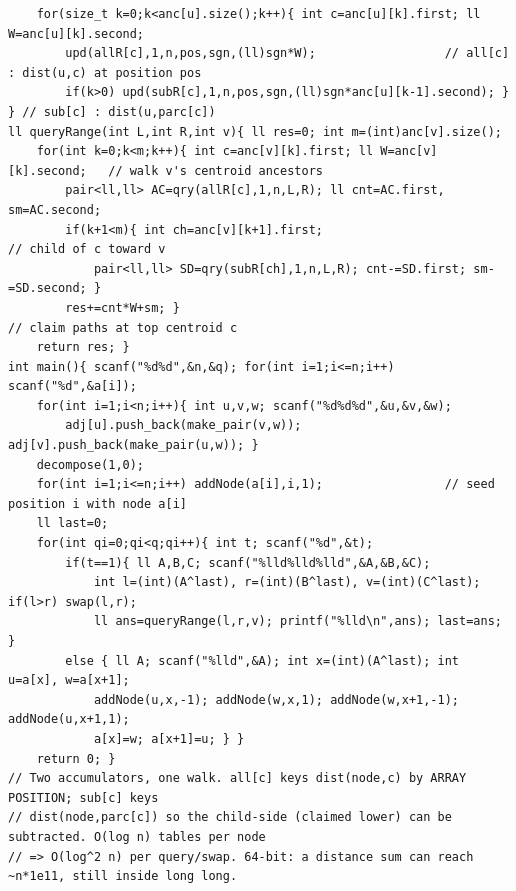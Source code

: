 \begin{lstlisting}
    for(size_t k=0;k<anc[u].size();k++){ int c=anc[u][k].first; ll W=anc[u][k].second;
        upd(allR[c],1,n,pos,sgn,(ll)sgn*W);                  // all[c] : dist(u,c) at position pos
        if(k>0) upd(subR[c],1,n,pos,sgn,(ll)sgn*anc[u][k-1].second); } } // sub[c] : dist(u,parc[c])
ll queryRange(int L,int R,int v){ ll res=0; int m=(int)anc[v].size();
    for(int k=0;k<m;k++){ int c=anc[v][k].first; ll W=anc[v][k].second;   // walk v's centroid ancestors
        pair<ll,ll> AC=qry(allR[c],1,n,L,R); ll cnt=AC.first, sm=AC.second;
        if(k+1<m){ int ch=anc[v][k+1].first;                          // child of c toward v
            pair<ll,ll> SD=qry(subR[ch],1,n,L,R); cnt-=SD.first; sm-=SD.second; }
        res+=cnt*W+sm; }                                              // claim paths at top centroid c
    return res; }
int main(){ scanf("%d%d",&n,&q); for(int i=1;i<=n;i++) scanf("%d",&a[i]);
    for(int i=1;i<n;i++){ int u,v,w; scanf("%d%d%d",&u,&v,&w);
        adj[u].push_back(make_pair(v,w)); adj[v].push_back(make_pair(u,w)); }
    decompose(1,0);
    for(int i=1;i<=n;i++) addNode(a[i],i,1);                 // seed position i with node a[i]
    ll last=0;
    for(int qi=0;qi<q;qi++){ int t; scanf("%d",&t);
        if(t==1){ ll A,B,C; scanf("%lld%lld%lld",&A,&B,&C);
            int l=(int)(A^last), r=(int)(B^last), v=(int)(C^last); if(l>r) swap(l,r);
            ll ans=queryRange(l,r,v); printf("%lld\n",ans); last=ans; }
        else { ll A; scanf("%lld",&A); int x=(int)(A^last); int u=a[x], w=a[x+1];
            addNode(u,x,-1); addNode(w,x,1); addNode(w,x+1,-1); addNode(u,x+1,1);
            a[x]=w; a[x+1]=u; } }
    return 0; }
// Two accumulators, one walk. all[c] keys dist(node,c) by ARRAY POSITION; sub[c] keys
// dist(node,parc[c]) so the child-side (claimed lower) can be subtracted. O(log n) tables per node
// => O(log^2 n) per query/swap. 64-bit: a distance sum can reach ~n*1e11, still inside long long.
\end{lstlisting}

